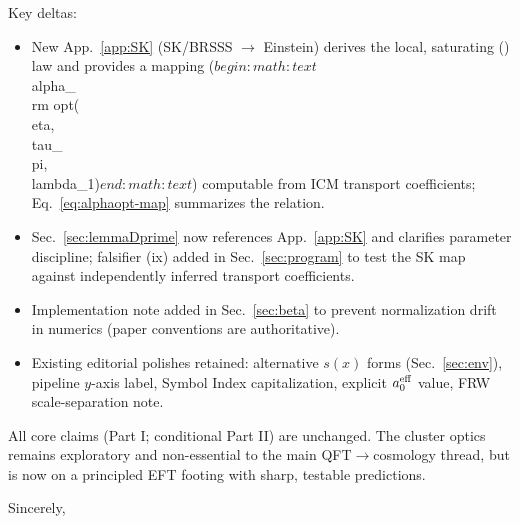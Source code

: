 \documentclass[aps,prd,onecolumn,superscriptaddress,nofootinbib]{revtex4-2}
\def\alpha{alpha}%
\def\alpha_M{alphaM}%
\begin{document}
Key deltas:
\begin{itemize}
\item New App.~\ref{app:SK} (SK/BRSSS $\to$ Einstein) derives the local, saturating (\Sigma) law and provides a mapping ($begin:math:text$\\alpha_{\\rm opt}(\\eta,\\tau_\\pi,\\lambda_1)$end:math:text$) computable from ICM transport coefficients; Eq.~\eqref{eq:alphaopt-map} summarizes the relation.
\item Sec.~\ref{sec:lemmaDprime} now references App.~\ref{app:SK} and clarifies parameter discipline; falsifier (ix) added in Sec.~\ref{sec:program} to test the SK map against independently inferred transport coefficients.
\item Implementation note added in Sec.~\ref{sec:beta} to prevent normalization drift in numerics (paper conventions are authoritative).
\item Existing editorial polishes retained: alternative $s(x)$ forms (Sec.~\ref{sec:env}), pipeline $y$-axis label, Symbol Index capitalization, explicit $a_0^{\rm eff}$ value, FRW scale-separation note.
\end{itemize}

All core claims (Part I; conditional Part II) are unchanged. The cluster optics remains exploratory and non-essential to the main QFT$\to$cosmology thread, but is now on a principled EFT footing with sharp, testable predictions.

Sincerely,\\
[Authors]
\fi
\end{document}
